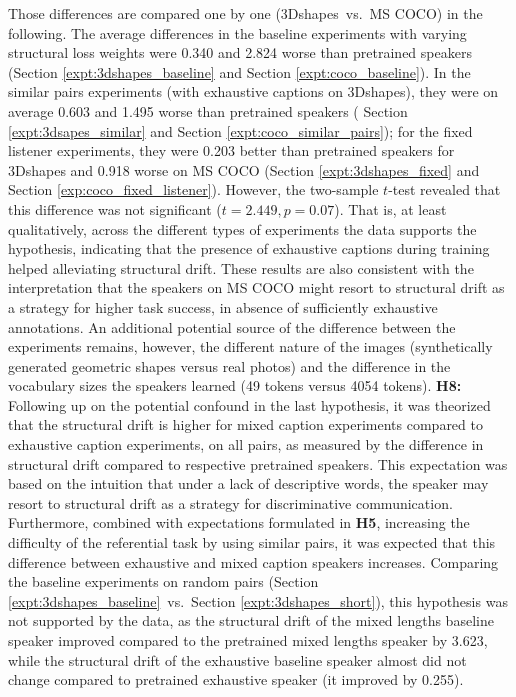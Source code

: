 Those differences are compared one by one (3Dshapes~vs.~MS COCO) in the following. The average differences in the baseline experiments with varying structural loss weights were 0.340 and 2.824 worse than pretrained speakers (Section \ref{expt:3dshapes_baseline} and Section \ref{expt:coco_baseline}). In the similar pairs experiments (with exhaustive captions on 3Dshapes), they were on average 0.603 and 1.495 worse than pretrained speakers ( Section \ref{expt:3dsapes_similar} and Section \ref{expt:coco_similar_pairs}); for the fixed listener experiments, they were 0.203 better than pretrained speakers for 3Dshapes and 0.918 worse on MS COCO (Section \ref{expt:3dshapes_fixed} and Section \ref{exp:coco_fixed_listener}). However, the two-sample $t$-test revealed that this difference was not significant ($t=2.449, p=0.07$).
That is, at least qualitatively, across the different types of experiments the data supports the hypothesis, indicating that the presence of exhaustive captions during training helped alleviating structural drift. These results are also consistent with the interpretation that the speakers on MS COCO might resort to structural drift as a strategy for higher task success, in absence of sufficiently exhaustive annotations.
An additional potential source of the difference between the experiments remains, however, the different nature of the images (synthetically generated geometric shapes versus real photos) and the difference in the vocabulary sizes the speakers learned (49 tokens versus 4054 tokens). \newline
\textbf{H8:} Following up on the potential confound in the last hypothesis, it was theorized that the structural drift is higher for mixed caption experiments compared to exhaustive caption experiments, on all pairs, as measured by the difference in structural drift compared to respective pretrained speakers. This expectation was based on the intuition that under a lack of descriptive words, the speaker may resort to structural drift as a strategy for discriminative communication. Furthermore, combined with expectations formulated in \textbf{H5}, increasing the difficulty of the referential task by using similar pairs, it was expected that this difference between exhaustive and mixed caption speakers increases. 
Comparing the baseline experiments on random pairs (Section \ref{expt:3dshapes_baseline}~vs.~Section \ref{expt:3dshapes_short}), this hypothesis was not supported by the data, as the structural drift of the mixed lengths baseline speaker improved compared to the pretrained mixed lengths speaker by 3.623, while the structural drift of the exhaustive baseline speaker almost did not change compared to pretrained exhaustive speaker (it improved by 0.255). %
